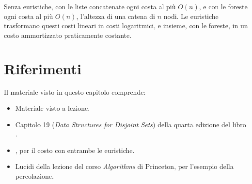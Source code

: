 Senza euristiche, con le liste concatenate ogni \Union{} costa al più $O(n)$, e con le foreste ogni \FindSet{} costa al più $O(n)$, l'altezza di una catena di $n$ nodi. Le euristiche trasformano questi costi lineari in costi logaritmici, e insieme, con le foreste, in un costo ammortizzato praticamente costante.

\section*{Riferimenti}
Il materiale visto in questo capitolo comprende:
\begin{itemize}
    \item Materiale visto a lezione.
    \item Capitolo 19 (\emph{Data Structures for Disjoint Sets}) della quarta edizione del libro  \cite{Cormen-et-al-2022}.
    \item {} \cite{Tarjan1975}, per il costo con entrambe le euristiche.
    \item Lucidi della lezione  \cite{Sedgewick-Wayne-UnionFind} del corso \emph{Algorithms} di Princeton, per l'esempio della percolazione.
\end{itemize}
